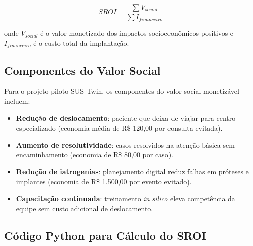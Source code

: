 \begin{equation}
    SROI = \frac{\sum V_{social}}{\sum I_{financeiro}}
    \label{eq:sroi}
\end{equation}

onde $V_{social}$ é o valor monetizado dos impactos socioeconômicos
positivos e $I_{financeiro}$ é o custo total da implantação.

\subsection{Componentes do Valor Social}

Para o projeto piloto SUS-Twin, os componentes do valor social
monetizável incluem:

\begin{itemize}
    \item \textbf{Redução de deslocamento}: paciente que deixa de
        viajar para centro especializado (economia média de
        R\$ 120,00 por consulta evitada).
    \item \textbf{Aumento de resolutividade}: casos resolvidos na
        atenção básica sem encaminhamento (economia de
        R\$ 80,00 por caso).
    \item \textbf{Redução de iatrogenias}: planejamento digital
        reduz falhas em próteses e implantes (economia de
        R\$ 1.500,00 por evento evitado).
    \item \textbf{Capacitação continuada}: treinamento \textit{in silico}
        eleva competência da equipe sem custo adicional de
        deslocamento.
\end{itemize}

\subsection{Código Python para Cálculo do SROI}

